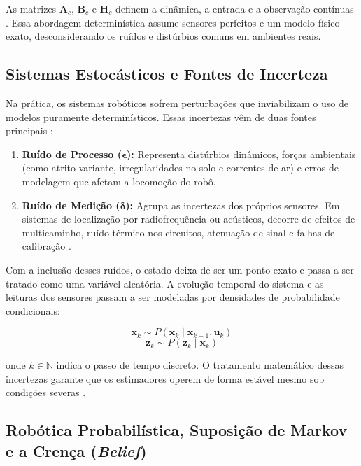 As matrizes $\mathbf{A}_c$, $\mathbf{B}_c$ e $\mathbf{H}_c$ definem a dinâmica, a entrada e a observação contínuas \cite{ogata2010}. Essa abordagem determinística assume sensores perfeitos e um modelo físico exato, desconsiderando os ruídos e distúrbios comuns em ambientes reais.

\subsection{Sistemas Estocásticos e Fontes de Incerteza}
\label{subsec:incertezas}

Na prática, os sistemas robóticos sofrem perturbações que inviabilizam o uso de modelos puramente determinísticos. Essas incertezas vêm de duas fontes principais \cite{reina2007adaptive}:

\begin{enumerate}
    \item \textbf{Ruído de Processo ($\boldsymbol{\epsilon}$):} Representa distúrbios dinâmicos, forças ambientais (como atrito variante, irregularidades no solo e correntes de ar) e erros de modelagem que afetam a locomoção do robô.
    \item \textbf{Ruído de Medição ($\boldsymbol{\delta}$):} Agrupa as incertezas dos próprios sensores. Em sistemas de localização por radiofrequência ou acústicos, decorre de efeitos de multicaminho, ruído térmico nos circuitos, atenuação de sinal e falhas de calibração \cite{barshalom2001estimation}.
\end{enumerate}

Com a inclusão desses ruídos, o estado deixa de ser um ponto exato e passa a ser tratado como uma variável aleatória. A evolução temporal do sistema e as leituras dos sensores passam a ser modeladas por densidades de probabilidade condicionais:

\begin{equation}
    \label{eq:prob_transicao}
    \mathbf{x}_k \sim P(\mathbf{x}_k \mid \mathbf{x}_{k-1}, \mathbf{u}_k)
\end{equation}
\begin{equation}
    \label{eq:prob_medicao}
    \mathbf{z}_k \sim P(\mathbf{z}_k \mid \mathbf{x}_k)
\end{equation}

onde $k \in \mathbb{N}$ indica o passo de tempo discreto. O tratamento matemático dessas incertezas garante que os estimadores operem de forma estável mesmo sob condições severas \cite{falek2020computer}.

\subsection{Robótica Probabilística, Suposição de Markov e a Crença (\textit{Belief})}
\label{subsec:prob_robotic}

